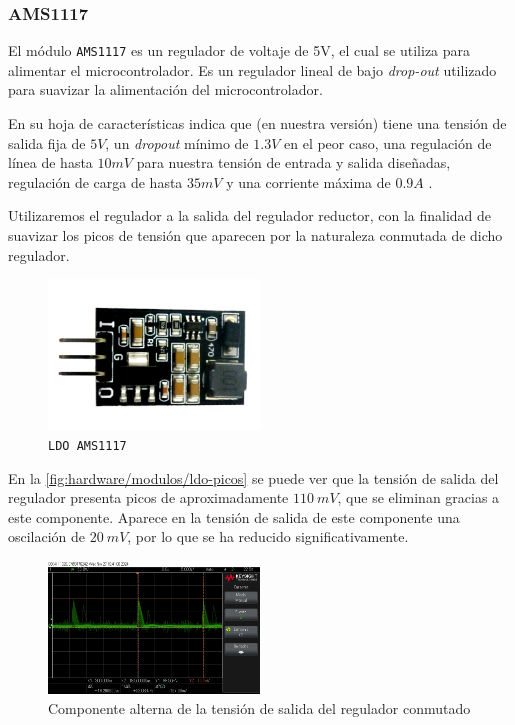 \subsubsection{AMS1117}

El módulo \texttt{AMS1117} es un regulador de voltaje de 5V, el cual se utiliza para alimentar el microcontrolador. Es un regulador lineal de bajo \textit{drop-out} utilizado para suavizar la alimentación del microcontrolador. 

En su hoja de características indica que (en nuestra versión) tiene una tensión de salida fija de $5 V$, un \textit{dropout} mínimo de $1.3 V$ en el peor caso, una regulación de línea de hasta $10 mV$ para nuestra tensión de entrada y salida diseñadas, regulación de carga de hasta $35 mV$ y una corriente máxima de $0.9 A$ \cite{advancedmonolithicsystemsAMS1117}.

Utilizaremos el regulador a la salida del regulador reductor, con la finalidad de suavizar los picos de tensión que aparecen por la naturaleza conmutada de dicho regulador.

\begin{figure}[H]
    \centering
    \includegraphics[width=0.5\textwidth]{images/2-hardware/componentes/AMS1117.png}
    \caption{\texttt{LDO AMS1117}}
    \label{fig:hardware/modulos/ldo-ams1117}
\end{figure}

En la \autoref{fig:hardware/modulos/ldo-picos} se puede ver que la tensión de salida del regulador presenta picos de aproximadamente $110\ mV$, que se eliminan gracias a este componente. Aparece en la tensión de salida de este componente una oscilación de $20\ mV$, por lo que se ha reducido significativamente.

\begin{figure}[H]
    \centering
    \includegraphics[width=0.5\textwidth]{images/2-hardware/componentes/ldo/picosSinLDO.jpg}
    \caption{Componente alterna de la tensión de salida del regulador conmutado}
    \label{fig:hardware/modulos/ldo-picos}
\end{figure}

